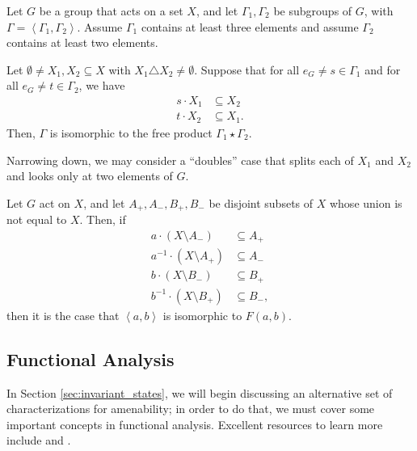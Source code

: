 \documentclass[10pt]{mypackage2}
\begin{document}
\begin{theorem}\label{thm:ping_pong_lemma}
  Let $G$ be a group that acts on a set $X$, and let $\Gamma_1,\Gamma_2$ be subgroups of $G$, with $\Gamma = \left\langle \Gamma_1,\Gamma_2 \right\rangle$. Assume $\Gamma_1$ contains at least three elements and assume $\Gamma_2$ contains at least two elements.\newline

  Let $\emptyset\neq X_1,X_2\subseteq X$ with $X_1\triangle X_2\neq\emptyset$. Suppose that for all $e_G\neq s\in \Gamma_1$ and for all $e_G\neq t\in \Gamma_2$, we have
  \begin{align*}
    s\cdot X_1&\subseteq X_2\\
    t\cdot X_2&\subseteq X_1.
  \end{align*}
  Then, $\Gamma$ is isomorphic to the free product $\Gamma_1\star \Gamma_2$.
\end{theorem}
Narrowing down, we may consider a ``doubles'' case that splits each of $X_1$ and $X_2$ and looks only at two elements of $G$.
\begin{corollary}\label{corollary:ping_pong_doubles}
  Let $G$ act on $X$, and let $A_{+}, A_{-},B_{+},B_{-}$ be disjoint subsets of $X$ whose union is not equal to $X$. Then, if
  \begin{align*}
    a\cdot \left(X\setminus A_{-}\right) &\subseteq A_{+}\\
    a^{-1}\cdot \left(X\setminus A_{+}\right) &\subseteq A_{-}\\
    b\cdot \left(X\setminus B_{-}\right) &\subseteq B_{+}\\
    b^{-1}\cdot \left(X\setminus B_{+}\right) &\subseteq B_{-},
  \end{align*}
  then it is the case that $\left\langle a,b \right\rangle$ is isomorphic to $F(a,b)$.
\end{corollary}
\subsection{Functional Analysis}%
In Section \ref{sec:invariant_states}, we will begin discussing an alternative set of characterizations for amenability; in order to do that, we must cover some important concepts in functional analysis. Excellent resources to learn more include \cite{rudin_functional_analysis} and \cite{aliprantis_infinite_dimensional_analysis}.\newline
\end{document}
